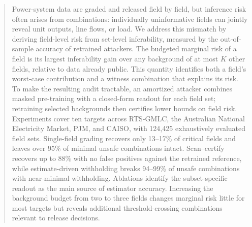 \begin{abstract}
Power-system data are graded and released field by field, but inference risk often arises from combinations: individually uninformative fields can jointly reveal unit outputs, line flows, or load. We address this mismatch by deriving field-level risk from set-level inferability, measured by the out-of-sample accuracy of retrained attackers. The budgeted marginal risk of a field is its largest inferability gain over any background of at most $K$ other fields, relative to data already public. This quantity identifies both a field's worst-case contribution and a witness combination that explains its risk. To make the resulting audit tractable, an amortized attacker combines masked pre-training with a closed-form readout for each field set; retraining selected backgrounds then certifies lower bounds on field risk. Experiments cover ten targets across RTS-GMLC, the Australian National Electricity Market, PJM, and CAISO, with 124,425 exhaustively evaluated field sets. Single-field grading recovers only 13--17\% of critical fields and leaves over 95\% of minimal unsafe combinations intact. Scan--certify recovers up to 88\% with no false positives against the retrained reference, while estimate-driven withholding breaks 94--99\% of unsafe combinations with near-minimal withholding. Ablations identify the subset-specific readout as the main source of estimator accuracy. Increasing the background budget from two to three fields changes marginal risk little for most targets but reveals additional threshold-crossing combinations relevant to release decisions.
\end{abstract}
